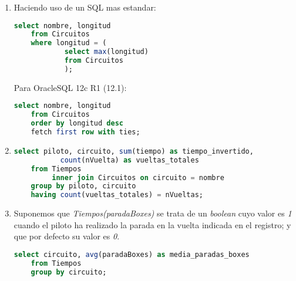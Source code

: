 \begin{enumerate}
	\item 
	Haciendo uso de un SQL mas estandar:
	\begin{lstlisting}[language=sql]
	select nombre, longitud
	from Circuitos
	where longitud = (
			select max(longitud)
			from Circuitos
			);\end{lstlisting}
	
	Para OracleSQL 12c R1 (12.1):
	\begin{lstlisting}[language=sql]
	select nombre, longitud
	from Circuitos
	order by longitud desc
	fetch first row with ties;\end{lstlisting}
	
	\item
	\begin{lstlisting}[language=sql]
	select piloto, circuito, sum(tiempo) as tiempo_invertido, 
		   count(nVuelta) as vueltas_totales
	from Tiempos
		 inner join Circuitos on circuito = nombre
	group by piloto, circuito
	having count(vueltas_totales) = nVueltas;\end{lstlisting}
	
	\newpage
	
	\item
	Suponemos que \textit{Tiempos(paradaBoxes)} se trata de un \textit{boolean} cuyo valor
	es \textit{1} cuando el piloto ha realizado la parada en la vuelta indicada en el
	registro; y que por defecto su valor es \textit{0}.
	\begin{lstlisting}[language=sql]
	select circuito, avg(paradaBoxes) as media_paradas_boxes
	from Tiempos
	group by circuito;\end{lstlisting}
\end{enumerate}